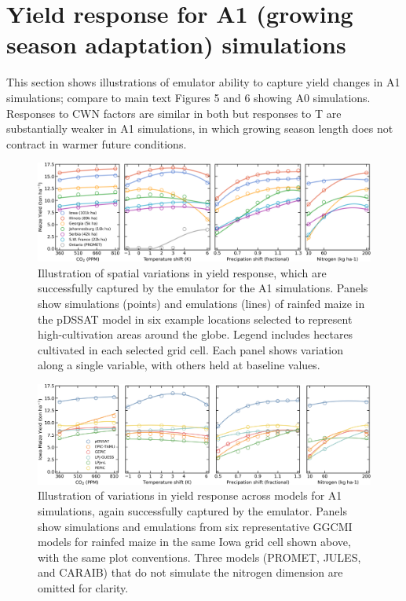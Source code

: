 \documentclass[12pt]{article}
\begin{document}
\section{Yield response for A1 (growing season adaptation) simulations}
\begin{justify}
	This section shows illustrations of emulator ability to capture yield changes in A1 simulations; compare to main text Figures 5 and 6 showing A0 simulations. Responses to CWN factors are similar in both but responses to T are substantially weaker in A1 simulations, in which growing season length does not contract in warmer future conditions.
\end{justify}

\begin{figure}[h!]
\centering
    \includegraphics[width=16.3cm]{regression_exampleA1.png}
    \caption{
    Illustration of spatial variations in yield response, which are successfully captured by the emulator for the A1 simulations. 
    Panels show simulations (points) and emulations (lines) of rainfed maize in the pDSSAT model in six example locations selected to represent high-cultivation areas around the globe. 
    Legend includes hectares cultivated in each selected grid cell. 
    Each panel shows variation along a single variable, with others held at baseline values. 
    }
   \label{fig:regression}
\end{figure}

\begin{figure}[h!]
\centering
    \includegraphics[width=16.3cm]{regression_exampleA1_2.png}
    \caption{
    Illustration of variations in yield response across models for A1 simulations, again successfully captured by the emulator. 
    Panels show simulations and emulations from six representative GGCMI models for rainfed maize in the same Iowa grid cell shown above, with the same plot conventions. 
    Three models (PROMET, JULES, and CARAIB) that do not simulate the nitrogen dimension are omitted for clarity. 
    }
   \label{fig:regression_2}
\end{figure}
\end{document}
